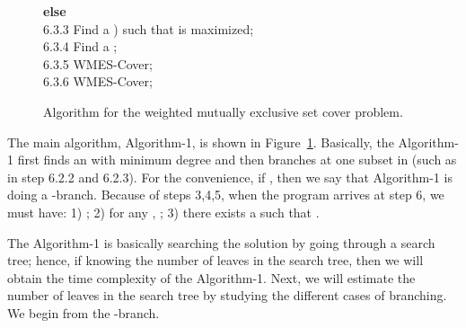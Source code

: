 \documentclass[11pt]{article}
\begin{document}
\begin{figure}[htb]
\begin{tabbing}
\>\> {\bf else}\\

6.3.3 \>\>\> Find a ) such that  is maximized;\\
6.3.4 \>\>\> Find a ; \\
6.3.5 \>\>\> WMES-Cover;\\
6.3.6 \>\>\> WMES-Cover;\\
\end{tabbing}
\vspace*{-3mm}
\caption{Algorithm for the {\sc weighted mutually exclusive set
cover} problem.} \label{Algorithm_main}
\end{figure}


The main algorithm, Algorithm-1, is shown in
Figure~\ref{Algorithm_main}. Basically, the Algorithm-1 first
finds an  with minimum degree and then branches at one
subset in  (such as in step 6.2.2 and 6.2.3). For the
convenience, if , then we say that Algorithm-1 is
doing a -branch. Because of steps 3,4,5, when the program
arrives at step 6, we must have: 1) ; 2) for
any , ; 3) there exists a  such that .

The Algorithm-1 is basically searching the solution by going
through a search tree; hence, if knowing the number of leaves in
the search tree, then we will obtain the time complexity of the
Algorithm-1. Next, we will estimate the number of leaves in the
search tree by studying the different cases of branching. We begin
from the -branch.
\end{document}
